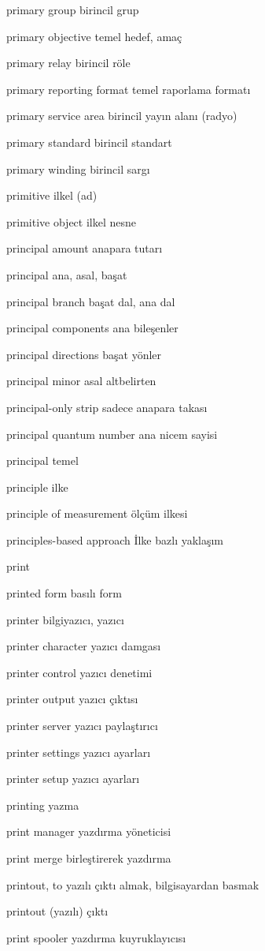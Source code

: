 \documentclass[12pt,fleqn]{article}\usepackage{../../common}
\begin{document}
primary group birincil grup

primary objective temel hedef, amaç

primary relay birincil röle

primary reporting format temel raporlama formatı

primary service area birincil yayın alanı (radyo)

primary standard birincil standart

primary winding birincil sargı

primitive ilkel (ad)

primitive object ilkel nesne

principal amount anapara tutarı

principal ana, asal, başat

principal branch başat dal, ana dal

principal components ana bileşenler

principal directions başat yönler

principal minor asal altbelirten

principal-only strip sadece anapara takası

principal quantum number ana nicem sayisi

principal temel

principle ilke

principle of measurement ölçüm ilkesi

principles-based approach İlke bazlı yaklaşım

print

printed form basılı form

printer bilgiyazıcı, yazıcı

printer character yazıcı damgası

printer control yazıcı denetimi

printer output yazıcı çıktısı

printer server yazıcı paylaştırıcı

printer settings yazıcı ayarları

printer setup yazıcı ayarları

printing yazma

print manager yazdırma yöneticisi

print merge birleştirerek yazdırma

printout, to yazılı çıktı almak, bilgisayardan basmak

printout (yazılı) çıktı

print spooler yazdırma kuyruklayıcısı
\end{document}
